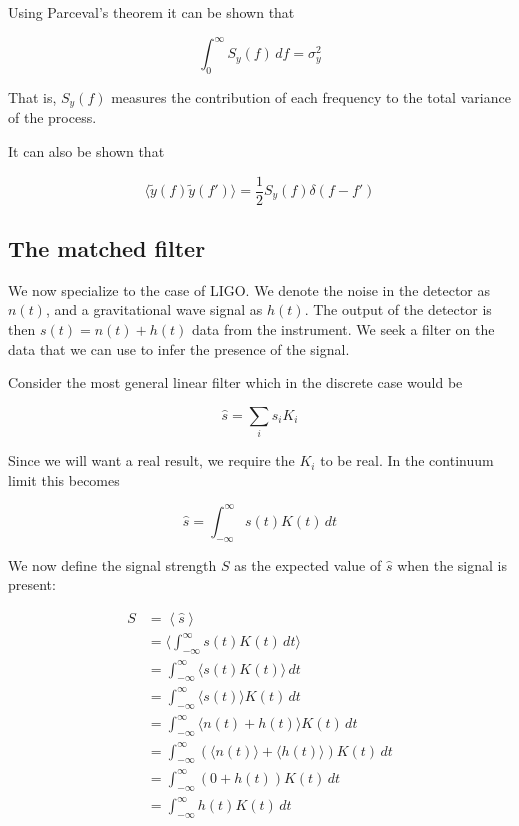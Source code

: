 Using Parceval's theorem it can be shown that

\begin{equation*}
\int_0^\infty S_y(f)\, df = \sigma^2_y
\end{equation*}

That is, $S_y(f)$ measures the contribution of each frequency 
to the total variance of the process.

It can also be shown that 

\begin{equation}
\label{eq:psd2}
\langle \tilde{y}(f) \tilde{y}(f')\rangle = \frac{1}{2} S_y(f)
\delta(f-f')
\end{equation}

\subsection{The matched filter}
\label{ssec:matched_filter}

We now specialize to the case of LIGO.  We denote the noise in the
detector as $n(t)$, and a gravitational wave signal as $h(t)$.  The
output of the detector is then $s(t)=n(t)+h(t)$ data from the
instrument.  We seek a filter on the data that we can use to infer the
presence of the signal.

Consider the most general linear filter which  in the discrete case
would be

\begin{equation}
\hat{s} = \sum_i s_i K_i
\end{equation}

Since we will want a real result, we require the $K_i$ to be real.  In
the continuum limit this becomes

\begin{equation}
\hat{s} = \int_{-\infty}^\infty s(t) K(t)\, dt
\end{equation}

We now define the signal strength $S$ as the expected value of
$\hat{s}$ when the signal is present:

\begin{align*}
S &= \left\langle \hat{s} \right\rangle \\
&= \langle  \int_{-\infty}^\infty s(t) K(t)\, dt \rangle \\
&= \int_{-\infty}^\infty \langle s(t) K(t)\rangle \, dt \\
&= \int_{-\infty}^\infty \langle s(t) \rangle K(t) \, dt \\
&= \int_{-\infty}^\infty \langle n(t) + h(t) \rangle K(t) \, dt \\
&= \int_{-\infty}^\infty \left( \langle n(t) \rangle + \langle h(t)
\rangle \right)  K(t) \, dt \\
&= \int_{-\infty}^\infty \left( 0 + h(t) \right)  K(t) \, dt \\
&= \int_{-\infty}^\infty h(t) K(t) \, dt \\
\end{align*}


